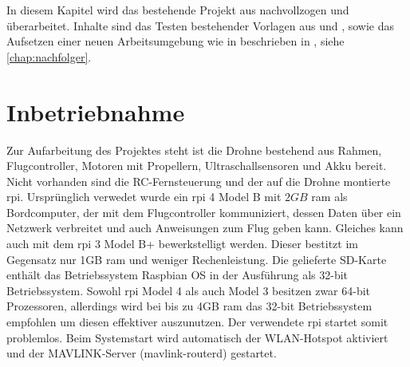 In diesem Kapitel wird das bestehende Projekt aus nachvollzogen und überarbeitet. Inhalte sind das Testen bestehender Vorlagen aus \cite{wirthErweiterungBestehendenDrohne2022} und \cite{wirthErweiterungBestehendenDrohne2022a}, sowie das Aufsetzen einer neuen Arbeitsumgebung wie in beschrieben in \cite{haraldwirthNachfolgerInfoStudienarbeitAutonome2022}, siehe \cref{chap:nachfolger}.

\section{Inbetriebnahme}\label{chap:einarbeite}
Zur Aufarbeitung des Projektes steht ist die Drohne bestehend aus Rahmen, Flugcontroller, Motoren mit Propellern, Ultraschallsensoren und Akku bereit. Nicht vorhanden sind die RC-Fernsteuerung und der auf die Drohne montierte \gls{rpi}. Ursprünglich verwedet wurde ein \gls{rpi} 4 Model B mit $2GB$ \gls{ram} als Bordcomputer, der mit dem Flugcontroller kommuniziert, dessen Daten über ein Netzwerk verbreitet und auch Anweisungen zum Flug geben kann. Gleiches kann auch mit dem \gls{rpi} 3 Model B+ bewerkstelligt werden. Dieser bestitzt im Gegensatz nur 1GB \gls{ram} und weniger Rechenleistung.
Die gelieferte SD-Karte enthält das Betriebssystem Raspbian OS in der Ausführung als 32-bit Betriebssystem. Sowohl \gls{rpi} Model 4 als auch Model 3 besitzen zwar 64-bit Prozessoren, allerdings wird bei bis zu 4GB \gls{ram} das 32-bit Betriebssystem empfohlen um diesen effektiver auszunutzen.
Der verwendete \gls{rpi} startet somit problemlos.
Beim Systemstart wird automatisch der WLAN-Hotspot aktiviert und der MAVLINK-Server (mavlink-routerd) gestartet. %

